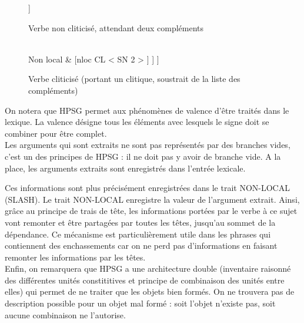 \begin{figure}[ht]
\begin{avm}
  [{}
    Phon & </\emph{mange}/> \\
    Synsem = Cat & [{cat}
                    sous-cat & < SN {1}, SN {2} >
                   ]
  ]
\end{avm}
\caption{Verbe non cliticisé, attendant deux compléments\label{phenomene.nclit}}
\end{figure}
\begin{figure}[ht]
\begin{avm}
  [{}
    Phon & </\emph{le mange}/> \\
    Synsem & [{synsem}
              Local = Cat & [{cat}
                             sous-cat < SN {1} >
                            ] \\
              Non local & [{nloc}
                           CL < SN {2} >
                          ]
             ]
  ]
\end{avm}
\caption{Verbe cliticisé (portant un clitique, soustrait de la liste des compléments)\label{phenomene.clit}}
\end{figure}

On notera que HPSG permet aux phénomènes de valence d'être traités dans le lexique.
La valence désigne tous les éléments avec lesquels le signe doit se combiner pour être complet.\\

Les arguments qui sont extraits ne sont pas représentés par des branches vides, c'est un des principes de HPSG : il ne doit pas y avoir de branche vide.
A la place, les arguments extraits sont enregistrés dans l'entrée lexicale.

Ces informations sont plus précisément enregistrées dans le trait NON-LOCAL (SLASH).
Le trait NON-LOCAL enregistre la valeur de l'argument extrait.
Ainsi, grâce au principe de trais de tête, les informations portées par le verbe à ce sujet vont remonter et être partagées par toutes les têtes, jusqu'au sommet de la dépendance.
Ce mécanisme est particulièrement utile dans les phrases qui contiennent des enchassements car on ne perd pas d'informations en faisant remonter les informations par les têtes.\\

Enfin, on remarquera que HPSG a une architecture double (inventaire raisonné des différentes unités constititives et principe de combinaison des unités entre elles) qui permet de ne traiter que les objets bien formés.
On ne trouvera pas de description possible pour un objet mal formé : soit l'objet n'existe pas, soit aucune combinaison ne l'autorise.
